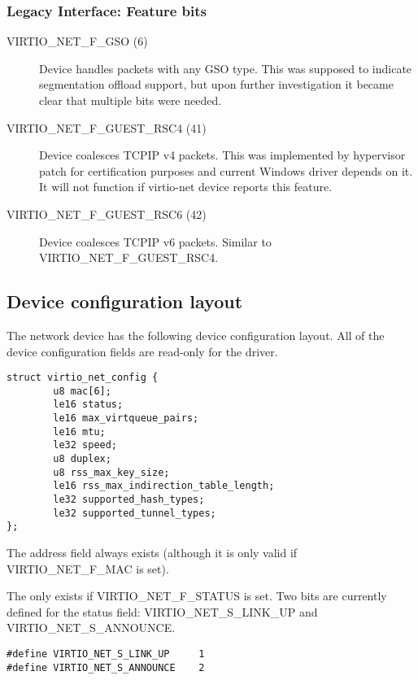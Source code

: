 \subsubsection{Legacy Interface: Feature bits}\label{sec:Device Types / Network Device / Feature bits / Legacy Interface: Feature bits}
\begin{description}
\item[VIRTIO_NET_F_GSO (6)] Device handles packets with any GSO type. This was supposed to indicate segmentation offload support, but
upon further investigation it became clear that multiple bits were needed.
\item[VIRTIO_NET_F_GUEST_RSC4 (41)] Device coalesces TCPIP v4 packets. This was implemented by hypervisor patch for certification
purposes and current Windows driver depends on it. It will not function if virtio-net device reports this feature.
\item[VIRTIO_NET_F_GUEST_RSC6 (42)] Device coalesces TCPIP v6 packets. Similar to VIRTIO_NET_F_GUEST_RSC4.
\end{description}

\subsection{Device configuration layout}\label{sec:Device Types / Network Device / Device configuration layout}
\label{sec:Device Types / Block Device / Feature bits / Device configuration layout}

The network device has the following device configuration layout.
All of the device configuration fields are read-only for the driver.

\begin{lstlisting}
struct virtio_net_config {
        u8 mac[6];
        le16 status;
        le16 max_virtqueue_pairs;
        le16 mtu;
        le32 speed;
        u8 duplex;
        u8 rss_max_key_size;
        le16 rss_max_indirection_table_length;
        le32 supported_hash_types;
        le32 supported_tunnel_types;
};
\end{lstlisting}

The  address field always exists (although it is only
valid if VIRTIO_NET_F_MAC is set).

The  only exists if VIRTIO_NET_F_STATUS is set.
Two bits are currently defined for the status field: VIRTIO_NET_S_LINK_UP
and VIRTIO_NET_S_ANNOUNCE.

\begin{lstlisting}
#define VIRTIO_NET_S_LINK_UP     1
#define VIRTIO_NET_S_ANNOUNCE    2
\end{lstlisting}

